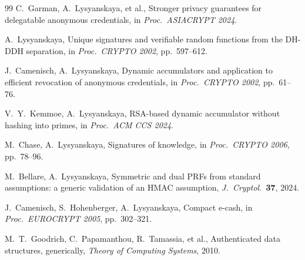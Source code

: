 \documentclass[11pt,letterpaper]{article}
\begin{document}
\begin{thebibliography}{99}
C.~Garman, A.~Lysyanskaya, et al.,
Stronger privacy guarantees for delegatable anonymous credentials,
in \emph{Proc.\ ASIACRYPT 2024}.

A.~Lysyanskaya,
Unique signatures and verifiable random functions from the DH-DDH separation,
in \emph{Proc.\ CRYPTO 2002}, pp.\ 597--612.

J.~Camenisch, A.~Lysyanskaya,
Dynamic accumulators and application to efficient revocation of anonymous credentials,
in \emph{Proc.\ CRYPTO 2002}, pp.\ 61--76.

V.~Y.~Kemmoe, A.~Lysyanskaya,
RSA-based dynamic accumulator without hashing into primes,
in \emph{Proc.\ ACM CCS 2024}.

M.~Chase, A.~Lysyanskaya,
Signatures of knowledge,
in \emph{Proc.\ CRYPTO 2006}, pp.\ 78--96.

M.~Bellare, A.~Lysyanskaya,
Symmetric and dual PRFs from standard assumptions: a generic validation of an HMAC assumption,
\emph{J.\ Cryptol.}\ \textbf{37}, 2024.

J.~Camenisch, S.~Hohenberger, A.~Lysyanskaya,
Compact e-cash,
in \emph{Proc.\ EUROCRYPT 2005}, pp.\ 302--321.

M.~T.~Goodrich, C.~Papamanthou, R.~Tamassia, et al.,
Authenticated data structures, generically,
\emph{Theory of Computing Systems}, 2010.

\end{thebibliography}
\end{document}
